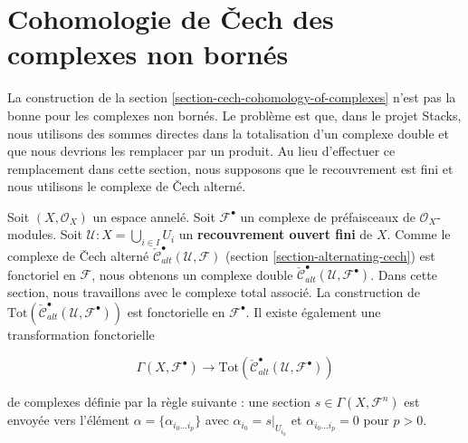 {\begin{example}
\end{example}















\section{Cohomologie de {\v C}ech des complexes non bornés}

\label{section-cech-cohomology-of-unbounded-complexes}

\noindent
La construction de la section \ref{section-cech-cohomology-of-complexes} n'est pas la bonne pour les complexes non bornés. Le problème est que, dans le projet Stacks, nous utilisons des sommes directes dans la totalisation d'un complexe double et que nous devrions les remplacer par un produit. Au lieu d'effectuer ce remplacement dans cette section, nous supposons que le recouvrement est fini et nous utilisons le complexe de {\v C}ech alterné.

\medskip\noindent

Soit $(X, \mathcal{O}_X)$ un espace annelé. Soit ${\mathcal F}^\bullet$ un complexe de préfaisceaux de
$\mathcal{O}_X$-modules. Soit ${\mathcal U} : X = \bigcup_{i \in I} U_i$
un {\bf recouvrement ouvert fini} de $X$. Comme le complexe de {\v C}ech alterné
$\check{\mathcal{C}}_{alt}^\bullet(\mathcal{U}, \mathcal{F})$
(section \ref{section-alternating-cech}) est fonctoriel en $\mathcal{F}$, nous obtenons un complexe double
$\check{\mathcal{C}}^\bullet_{alt}(\mathcal{U}, \mathcal{F}^\bullet)$. Dans cette section, nous travaillons avec le complexe total associé.
La construction de $\text{Tot}(\check{\mathcal{C}}^\bullet_{alt}({\mathcal U},
{\mathcal F}^\bullet))$
est fonctorielle en ${\mathcal F}^\bullet$. Il existe également une transformation fonctorielle

\begin{equation}
\label{equation-global-sections-to-alternating-cech}
\Gamma(X, {\mathcal F}^\bullet)
\longrightarrow
\text{Tot}(\check{\mathcal{C}}^\bullet_{alt}({\mathcal U},
{\mathcal F}^\bullet))
\end{equation}

de complexes définie par la règle suivante : une section
$s\in \Gamma(X, {\mathcal F}^n)$
est envoyée vers l'élément $\alpha = \{\alpha_{i_0\ldots i_p}\}$
avec $\alpha_{i_0} = s|_{U_{i_0}}$ et $\alpha_{i_0\ldots i_p} = 0$
pour $p > 0$.

}
